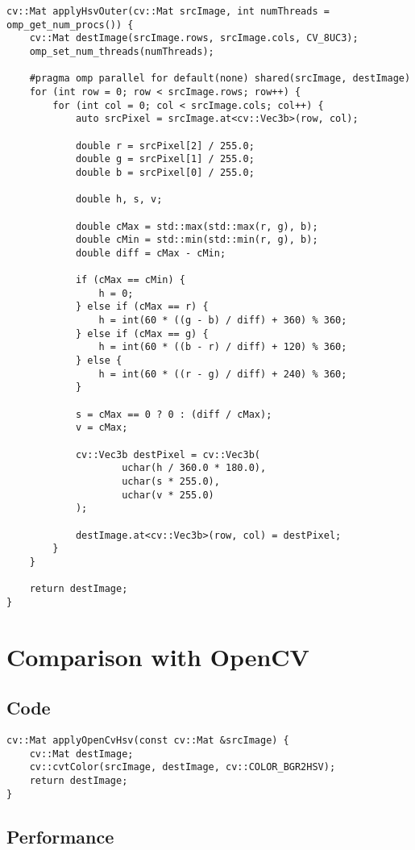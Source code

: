 \begin{listing}[H]
    \begin{verbatim}
cv::Mat applyHsvOuter(cv::Mat srcImage, int numThreads = omp_get_num_procs()) {
    cv::Mat destImage(srcImage.rows, srcImage.cols, CV_8UC3);
    omp_set_num_threads(numThreads);

    #pragma omp parallel for default(none) shared(srcImage, destImage)
    for (int row = 0; row < srcImage.rows; row++) {
        for (int col = 0; col < srcImage.cols; col++) {
            auto srcPixel = srcImage.at<cv::Vec3b>(row, col);

            double r = srcPixel[2] / 255.0;
            double g = srcPixel[1] / 255.0;
            double b = srcPixel[0] / 255.0;

            double h, s, v;

            double cMax = std::max(std::max(r, g), b);
            double cMin = std::min(std::min(r, g), b);
            double diff = cMax - cMin;

            if (cMax == cMin) {
                h = 0;
            } else if (cMax == r) {
                h = int(60 * ((g - b) / diff) + 360) % 360;
            } else if (cMax == g) {
                h = int(60 * ((b - r) / diff) + 120) % 360;
            } else {
                h = int(60 * ((r - g) / diff) + 240) % 360;
            }

            s = cMax == 0 ? 0 : (diff / cMax);
            v = cMax;

            cv::Vec3b destPixel = cv::Vec3b(
                    uchar(h / 360.0 * 180.0),
                    uchar(s * 255.0),
                    uchar(v * 255.0)
            );

            destImage.at<cv::Vec3b>(row, col) = destPixel;
        }
    }

    return destImage;
}
    \end{verbatim}
    \label{listing:hsv}
\end{listing}

\section{Comparison with OpenCV}

\subsection{Code}


\begin{listing}[H]
    \begin{verbatim}
cv::Mat applyOpenCvHsv(const cv::Mat &srcImage) {
    cv::Mat destImage;
    cv::cvtColor(srcImage, destImage, cv::COLOR_BGR2HSV);
    return destImage;
}
    \end{verbatim}
    \label{listing:hsv_opencv}
\end{listing}

\subsection{Performance}